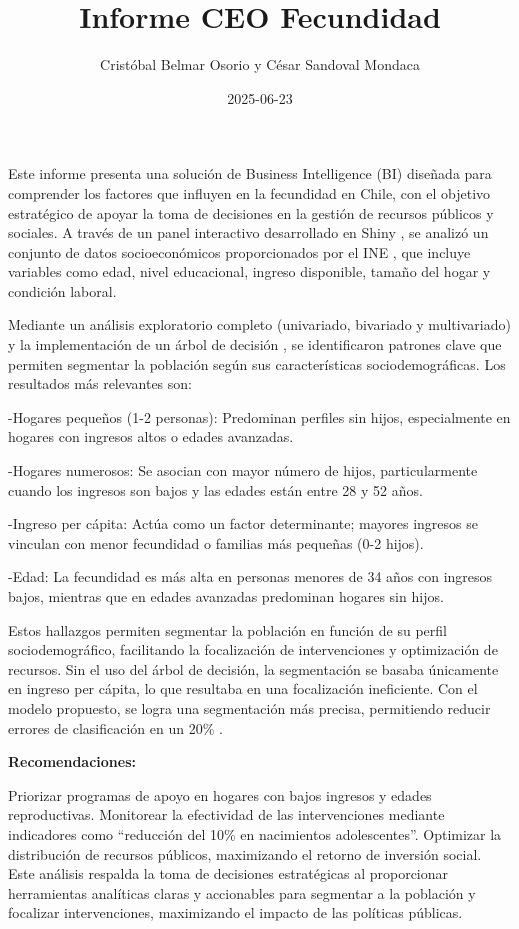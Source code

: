 \documentclass[
]{article}
\title{Informe CEO Fecundidad}
\author{Cristóbal Belmar Osorio y César Sandoval Mondaca}
\date{2025-06-23}
\begin{document}
\maketitle

{
\setcounter{tocdepth}{2}
\tableofcontents
}
Este informe presenta una solución de Business Intelligence (BI)
diseñada para comprender los factores que influyen en la fecundidad en
Chile, con el objetivo estratégico de apoyar la toma de decisiones en la
gestión de recursos públicos y sociales. A través de un panel
interactivo desarrollado en Shiny , se analizó un conjunto de datos
socioeconómicos proporcionados por el INE , que incluye variables como
edad, nivel educacional, ingreso disponible, tamaño del hogar y
condición laboral.

Mediante un análisis exploratorio completo (univariado, bivariado y
multivariado) y la implementación de un árbol de decisión , se
identificaron patrones clave que permiten segmentar la población según
sus características sociodemográficas. Los resultados más relevantes
son:

-Hogares pequeños (1-2 personas): Predominan perfiles sin hijos,
especialmente en hogares con ingresos altos o edades avanzadas.

-Hogares numerosos: Se asocian con mayor número de hijos,
particularmente cuando los ingresos son bajos y las edades están entre
28 y 52 años.

-Ingreso per cápita: Actúa como un factor determinante; mayores ingresos
se vinculan con menor fecundidad o familias más pequeñas (0-2 hijos).

-Edad: La fecundidad es más alta en personas menores de 34 años con
ingresos bajos, mientras que en edades avanzadas predominan hogares sin
hijos.

Estos hallazgos permiten segmentar la población en función de su perfil
sociodemográfico, facilitando la focalización de intervenciones y
optimización de recursos. Sin el uso del árbol de decisión, la
segmentación se basaba únicamente en ingreso per cápita, lo que
resultaba en una focalización ineficiente. Con el modelo propuesto, se
logra una segmentación más precisa, permitiendo reducir errores de
clasificación en un 20\% .

\textbf{Recomendaciones:}

Priorizar programas de apoyo en hogares con bajos ingresos y edades
reproductivas. Monitorear la efectividad de las intervenciones mediante
indicadores como ``reducción del 10\% en nacimientos adolescentes''.
Optimizar la distribución de recursos públicos, maximizando el retorno
de inversión social. Este análisis respalda la toma de decisiones
estratégicas al proporcionar herramientas analíticas claras y
accionables para segmentar a la población y focalizar intervenciones,
maximizando el impacto de las políticas públicas.
\end{document}
